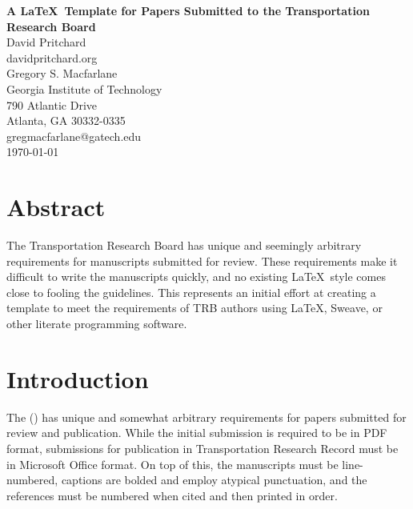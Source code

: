 \documentclass[titlepage,oneside,12pt]{article}
\newcommand{\trbcite}[1]{\citeauthor{#1} ({\it \citenum{#1}})}
\newcommand\wordcount{
    \immediate\write18{texcount -sum -1 \jobname.tex > 'count.txt'}  }
\begin{document}
	\pagewiselinenumbers %
	\thispagestyle{empty}

\begin{titlepage}
\begin{flushleft}

{\LARGE \bfseries A \LaTeX\ Template for Papers Submitted to the Transportation
Research Board}\\[1cm]

David Pritchard \\
davidpritchard.org\\[0.5cm]

Gregory S. Macfarlane\\
Georgia Institute of Technology \\
790 Atlantic Drive \\
Atlanta, GA 30332-0335 \\
gregmacfarlane@gatech.edu\\[1cm]


\today
\end{flushleft}
\end{titlepage}


\newpage

\thispagestyle{empty}
\section{Abstract}
The Transportation Research Board has unique and seemingly arbitrary
requirements for manuscripts submitted for review. These requirements make it
difficult to write the manuscripts quickly, and no existing \LaTeX\ style comes
close to fooling the guidelines. This represents an initial effort at creating a
template to meet the requirements of TRB authors using \LaTeX, Sweave, or other
literate programming software.

\newpage

\section{Introduction}
The \trbcite{TRBGuide} has unique and somewhat arbitrary requirements
for papers submitted for review and publication. While the initial submission is
required to be in PDF format, submissions for publication in Transportation
Research Record must be in Microsoft Office format. On top of this, the
manuscripts must be line-numbered, captions are bolded and employ atypical
punctuation, and the references must be numbered when cited and then printed in
order.
\end{document}
